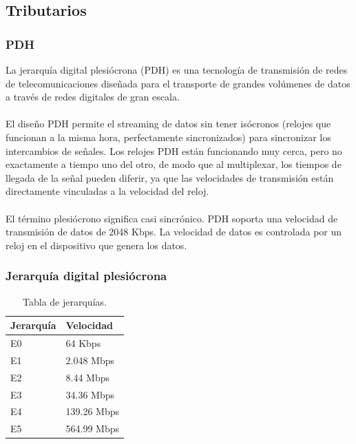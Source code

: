 \documentclass[12pt,letterpaper]{article}
\begin{document}
\subsection{Tributarios}
\subsubsection{PDH}
La jerarquía digital plesiócrona (PDH) es una tecnología de transmisión de redes de 
telecomunicaciones diseñada para el transporte de grandes volúmenes de datos a través de 
redes digitales de gran escala.
\\ \\
El diseño PDH permite el streaming de datos sin tener isócronos (relojes que funcionan a 
la misma hora, perfectamente sincronizados) para sincronizar los intercambios de señales. 
Los relojes PDH están funcionando muy cerca, pero no exactamente a tiempo uno del otro, 
de modo que al multiplexar, los tiempos de llegada de la señal pueden diferir, ya que 
las velocidades de transmisión están directamente vinculadas a la velocidad del reloj.
\\ \\
El término plesiócrono significa casi sincrónico. PDH soporta una velocidad de 
transmisión de datos de 2048 Kbps. La velocidad de datos es controlada por un reloj en 
el dispositivo que genera los datos. \cite{pdh}

\subsubsection{Jerarquía digital plesiócrona}
\begin{table}[ht]
    \centering
    \begin{tabular}{|l|l|}
    \hline
    Jerarquía & Velocidad \\ \hline
    E0 & 64 Kbps \\ \hline
    E1 & 2.048 Mbps \\ \hline
    E2 & 8.44 Mbps \\ \hline
    E3 & 34.36 Mbps \\ \hline
    E4 & 139.26 Mbps \\ \hline
    E5 & 564.99 Mbps \\ \hline
    \end{tabular}
    \caption{Tabla de jerarquías.}
    \label{my-label}
\end{table}
\end{document}

